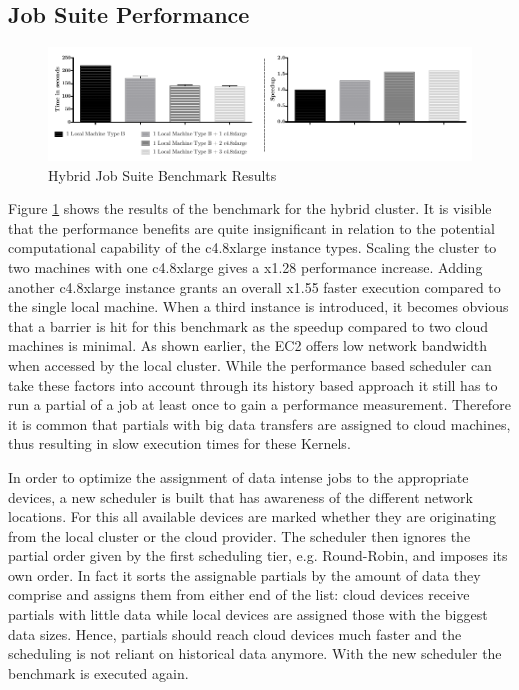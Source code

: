 \subsection*{Job Suite Performance}

\begin{figure}[H]
	\includegraphics[width=1.0\textwidth]{images/hybrid_full_benchmark_performance_based.pdf}
	\centering
	\caption{Hybrid Job Suite Benchmark Results}
	\label{img:hybrid_benchmark_results}
\end{figure}

Figure \ref{img:hybrid_benchmark_results} shows the results of the benchmark for the hybrid cluster. It is visible that the performance benefits are quite insignificant in relation to the potential computational capability of the c4.8xlarge instance types. Scaling the cluster to two machines with one c4.8xlarge gives a x1.28 performance increase. Adding another c4.8xlarge instance grants an overall x1.55 faster execution compared to the single local machine. When a third instance is introduced, it becomes obvious that a barrier is hit for this benchmark as the speedup compared to two cloud machines is minimal. As shown earlier, the EC2 offers low network bandwidth when accessed by the local cluster. While the performance based scheduler can take these factors into account through its history based approach it still has to run a partial of a job at least once to gain a performance measurement. Therefore it is common that partials with big data transfers are assigned to cloud machines, thus resulting in slow execution times for these Kernels.

In order to optimize the assignment of data intense jobs to the appropriate devices, a new scheduler is built that has awareness of the different network locations. For this all available devices are marked whether they are originating from the local cluster or the cloud provider. The scheduler then ignores the partial order given by the first scheduling tier, e.g. Round-Robin, and imposes its own order. In fact it sorts the assignable partials by the amount of data they comprise and assigns them from either end of the list: cloud devices receive partials with little data while local devices are assigned those with the biggest data sizes. Hence, partials should reach cloud devices much faster and the scheduling is not reliant on historical data anymore. With the new scheduler the benchmark is executed again.


